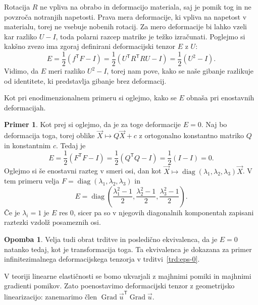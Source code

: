 \documentclass[12pt,a4paper,twoside]{article}
\theoremstyle{definition} %
\newtheorem{primer}[definicija]{Primer}
\newtheorem{opomba}[definicija]{Opomba}
\theoremstyle{plain} %
\numberwithin{equation}{section}
\newcommand{\T}{\mathsf{T}}
\newcommand{\Grad}{\operatorname{Grad}}
\newcommand{\vu}{\vec{u}}
\newcommand{\vX}{\vec{X}}
\DeclareMathOperator{\diag}{diag}
\begin{document}
Rotacija $R$ ne vpliva na obrabo in deformacijo materiala, saj je pomik tog in ne povzroča notranjih
napetosti. Prava mera deformacije, ki vpliva na napetost v materialu, torej ne vsebuje nobenih
rotacij. Za mero deformacije bi lahko vzeli kar razliko $U - I$, toda polarni razcep matrike je
težko izračunati. Poglejmo si kakšno zvezo ima zgoraj definirani deformacijski tenzor $E$ z $U$:
\begin{equation}
   E = \frac12(f^\T F - I) = \frac12(U^\T R^\T R U - I) = \frac12 (U^2 - I).
\end{equation}
Vidimo, da $E$ meri razliko $U^2 - I$, torej nam pove, kako se naše gibanje razlikuje od identitete,
ki predstavlja gibanje brez deformacij.

Kot pri enodimenzionalnem primeru si oglejmo, kako se $E$ obnaša pri enostavnih
deformacijah.
\begin{primer}
  Kot prej si oglejmo, da je za toge deformacije $E = 0$. Naj bo deformacija toga, torej oblike
  $\vX \mapsto Q\vX + c$ z ortogonalno konstantno matriko $Q$ in konstantnim $c$. Tedaj je
  \begin{equation}
     E = \frac12 (F^\T F - I) = \frac12(Q^\T Q - I) = \frac12(I - I) = 0.
  \end{equation}
  Oglejmo si še enostavni razteg v smeri osi, dan kot
  $\vX \mapsto \diag(\lambda_1, \lambda_2, \lambda_3) \vX$.
  V tem primeru velja $F = \diag(\lambda_1, \lambda_2, \lambda_3)$ in
  \begin{equation}
    E = \diag\left(
      \frac{\lambda_1^2-1}{2},
      \frac{\lambda_2^2-1}{2},
      \frac{\lambda_3^2-1}{2}
    \right).
  \end{equation}
  Če je $\lambda_i = 1$ je $E$ res 0, sicer pa so v njegovih diagonalnih
  komponentah zapisani raztezki vzdolž posameznih osi.
\end{primer}
\begin{opomba}
  Velja tudi obrat trditve in posledično ekvivalenca, da je $E = 0$ natanko tedaj, kot je
  transformacija toga. Ta ekvivalenca je dokazana za primer infinitezimalnega deformacijskega
  tenzorja v trditvi~\ref{trd:eps-0}.
\end{opomba}

V teoriji linearne elastičnosti se bomo ukvarjali z majhnimi pomiki in majhnimi
gradienti pomikov. Zato poenostavimo deformacijski tenzor z geometrijsko
linearizacijo: zanemarimo člen $\Grad \vu^\T \Grad \vu$.
\end{document}
